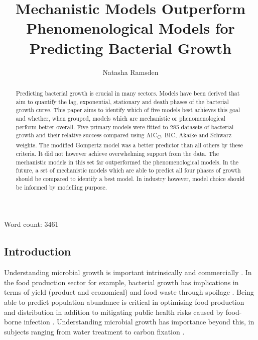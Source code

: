 \documentclass[11pt]{article}
\title{Mechanistic Models Outperform Phenomenological Models for Predicting Bacterial Growth}
\author[1]{Natasha Ramsden}
\affil[1]{Imperial College London}
\date{}
\begin{document}
    \begin{titlepage}
    \maketitle
    \thispagestyle{empty}
    
    \begin{center}
        Word count: 3461
    \end{center}
    
    \end{titlepage}

    \begin{linenumbers}
    
    \begin{abstract}
        
        Predicting bacterial growth is crucial in many sectors. Models have been derived that aim to quantify the lag, exponential, stationary and death phases of the bacterial growth curve. This paper aims to identify which of five models best achieves this goal and whether, when grouped, models which are mechanistic or phenomenological perform better overall. Five primary models were fitted to 285 datasets of bacterial growth and their relative success compared using AIC\textsubscript{C}, BIC, Akaike and Schwarz weights. The modified Gompertz model was a better predictor than all others by these criteria. It did not however achieve overwhelming support from the data. The mechanistic models in this set far outperformed the phenomenological models. In the future, a set of mechanistic models which are able to predict all four phases of growth should be compared to identify a best model. In industry however, model choice should be informed by modelling purpose.

    \end{abstract}


    \section{Introduction}
    
        Understanding microbial growth is important intrinsically and commercially \citep{najafpour_chapter_2007}. In the food production sector for example, bacterial growth has implications in terms of yield (product and economical) and food waste through spoilage \citep{zwietering_modeling_1990}. Being able to predict population abundance is critical in optimising food production and distribution in addition to mitigating public health risks caused by food-borne infection \citep{ross_modeling_2003, mahdinia_microbial_2020}. Understanding microbial growth has importance beyond this, in subjects ranging from water treatment to carbon fixation \citep{esser_modeling_2015}.
        

\end{linenumbers}
\end{document}
